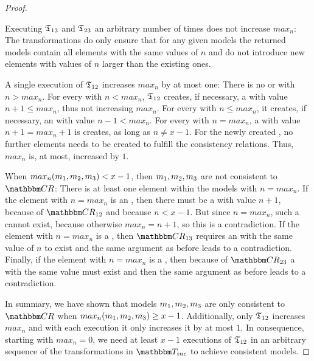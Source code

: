 \begin{proof}
    \begin{properdescription}
        \item[Executing $\mathfrak{T}_{13}$ and $\mathfrak{T}_{23}$ an arbitrary number of times does not increase $max_n$:]
        The transformations do only ensure that for any given models the returned models contain all elements with the same values of $n$ and do not introduce new elements with values of $n$ larger than the existing ones.
        \item[A single execution of $\mathfrak{T}_{12}$ increases $max_n$ by at most one:]
        There is no  or  with $n > max_n$.
        For every  with $n < max_n$, $\mathfrak{T}_{12}$ creates, if necessary, a  with value $n + 1 \leq max_n$, thus not increasing $max_n$.
        For every  with $n \leq max_n$, it creates, if necessary, an  with value $n-1 < max_n$.
        For every  with $n = max_n$, a  with value $n+1 = max_n + 1$ is creates, as long as $n \neq x-1$.
        For the newly created , no further elements needs to be created to fulfill the consistency relations.
        Thus, $max_n$ is, at most, increased by $1$.
        \item[ When $max_n(m_{1},m_{2},m_{3}) < x-1$, then $m_{1},m_{2},m_{3}$ are not consistent to $\consistencyrelationset{CR}$:]
        There is at least one element within the models with $n = max_n$.
        If the element with $n = max_n$ is an , then there must be a  with value $n+1$, because of $\consistencyrelationset{CR}_{12}$ and because $n < x-1$.
        But since $n = max_n$, such a  cannot exist, because otherwise $max_n = n+1$, so this is a contradiction.    
        If the element with $n = max_n$ is a , then $\consistencyrelationset{CR}_{13}$ requires an  with the same value of $n$ to exist and the same argument as before leads to a contradiction.
        Finally, if the element with $n = max_n$ is a , then because of $\consistencyrelationset{CR}_{23}$ a  with the same value must exist and then the same argument as before leads to a contradiction.
    \end{properdescription}

    In summary, we have shown that models $m_{1},m_{2},m_{3}$ are only consistent to $\consistencyrelationset{CR}$ when $max_n(m_{1},m_{2},m_{3}) \geq x-1$.
    Additionally, only $\mathfrak{T}_{12}$ increases $max_n$ and with each execution it only increases it by at most $1$.
    In consequence, starting with $max_n = 0$, we need at least $x-1$ executions of $\mathfrak{T}_{12}$ in an arbitrary sequence of the transformations in $\transformationset{T}_{inc}$ to achieve consistent models.
\end{proof}

